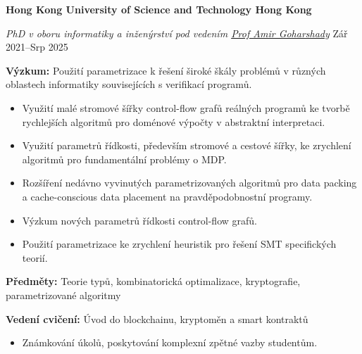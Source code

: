 \ifczech

\textbf{Hong Kong University of Science and Technology \hfill Hong Kong} \par
\textit{PhD v oboru informatiky a inženýrství pod vedením \href{https://scholar.google.com/citations?user=4o8gvAYAAAAJ&hl=en&oi=ao}{Prof Amir Goharshady}} \hfill Zář 2021--Srp 2025\par
\textbf{Výzkum:} Použití parametrizace k řešení široké škály problémů v různých oblastech informatiky souvisejících s verifikací programů.
    \begin{itemize}
\item Využití malé stromové šířky control-flow grafů reálných programů ke tvorbě rychlejších algoritmů pro doménové výpočty v abstraktní interpretaci.
        \item Využití parametrů řídkosti, především stromové a cestové šířky, ke zrychlení algoritmů pro fundamentální problémy o MDP.
        \item Rozšíření nedávno vyvinutých parametrizovaných algoritmů pro data packing a cache-conscious data placement na pravděpodobnostní programy.
        \item Výzkum nových parametrů řídkosti control-flow grafů. 
        \item Použití parametrizace ke zrychlení heuristik pro řešení SMT specifických teorií.
    \end{itemize} \par
\textbf{Předměty:} Teorie typů, kombinatorická optimalizace, kryptografie, parametrizované algoritmy\par
\textbf{Vedení cvičení:} Úvod do blockchainu, kryptoměn a smart kontraktů
\begin{itemize}
    \item Známkování úkolů, poskytování komplexní zpětné vazby studentům.
\end{itemize}

\else


